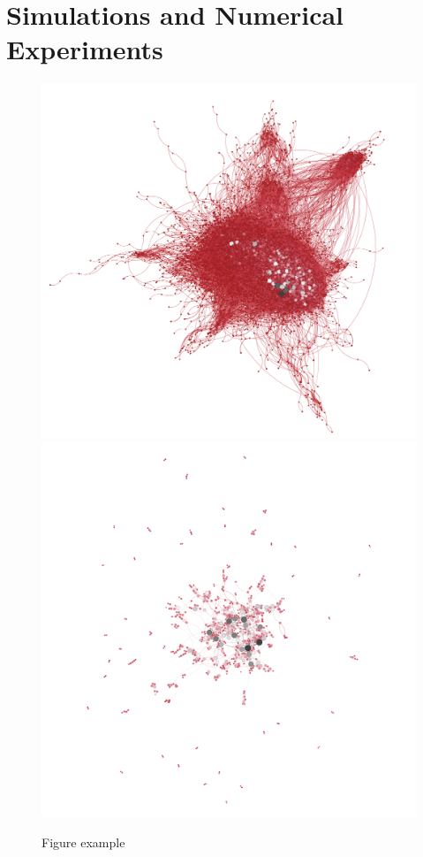 \section{Simulations and Numerical Experiments}
\begin{figure}[ht]
    \centering
    \includegraphics[width=0.4\linewidth]{figures/tw.png}
    \includegraphics[width=0.4\linewidth]{figures/SMS_network.png}
    \caption{Figure example}
    \label{fig:enter-label}
\end{figure}
\lipsum[9-12]

